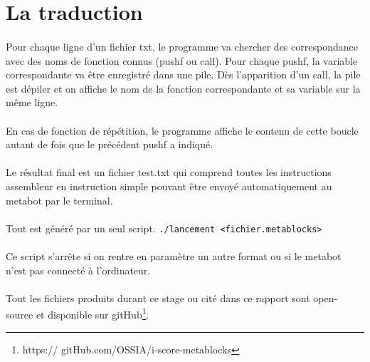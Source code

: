 \documentclass[10pt,a4paper]{report}
\begin{document}
\paragraph{}
\section{La traduction}
\paragraph{}
Pour chaque ligne d'un fichier txt, le programme va chercher des correspondance avec des noms de fonction connus (pushf ou call). Pour chaque pushf, la variable correspondante va être enregistré dans une pile. Dès l'apparition d'un call, la pile est dépiler et on affiche le nom de la fonction correspondante et sa variable sur la même ligne.
\paragraph{}
En cas de fonction de répétition, le programme affiche le contenu de cette boucle autant de fois que le précédent pushf a indiqué.
\paragraph{}
Le résultat final est un fichier test.txt qui comprend toutes les instructions assembleur en instruction simple pouvant être envoyé automatiquement au metabot par le terminal.
\paragraph{}
Tout est généré par un seul script.
\texttt{./lancement <fichier.metablocks>}
\paragraph{}
Ce script s'arrête si on rentre en paramètre un autre format ou si le metabot n'est pas connecté à l'ordinateur.
\paragraph{}
Tout les fichiers produits durant ce stage ou cité dans ce rapport sont open-source et disponible sur  gitHub\footnote{https:// gitHub.com/OSSIA/i-score-metablocks}.
\end{document}
